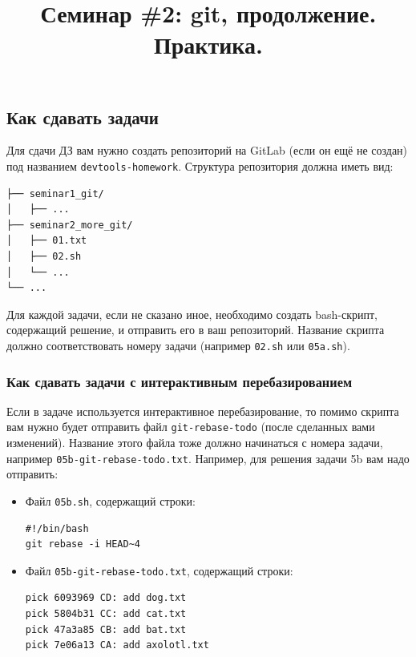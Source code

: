 \documentclass{article}
\begin{document}
\title{Семинар \#2: git, продолжение. Практика. \vspace{-5ex}}\date{}\maketitle

\subsection*{Как сдавать задачи}
Для сдачи ДЗ вам нужно создать репозиторий на GitLab (если он ещё не создан) под названием \texttt{devtools-homework}. Структура репозитория должна иметь вид:
\begin{center}
\begin{BVerbatim}
├── seminar1_git/
│   ├── ...
├── seminar2_more_git/
│   ├── 01.txt
│   ├── 02.sh
│   └── ...
└── ...
\end{BVerbatim}
\end{center}
Для каждой задачи, если не сказано иное, необходимо создать bash-скрипт, содержащий решение, и отправить его в ваш репозиторий. Название скрипта должно соответствовать номеру задачи (например \texttt{02.sh} или \texttt{05a.sh}). 

\subsubsection*{Как сдавать задачи с интерактивным перебазированием}
Если в задаче используется интерактивное перебазирование, то помимо скрипта вам нужно будет отправить файл \texttt{git-rebase-todo} (после сделанных вами изменений). Название этого файла тоже должно начинаться с номера задачи, например \texttt{05b-git-rebase-todo.txt}.
Например, для решения задачи 5b вам надо отправить:
\begin{itemize}
\item Файл \texttt{05b.sh}, содержащий строки:
\begin{lstlisting}
#!/bin/bash
git rebase -i HEAD~4
\end{lstlisting}
\item Файл \texttt{05b-git-rebase-todo.txt}, содержащий строки:
\begin{lstlisting}
pick 6093969 CD: add dog.txt
pick 5804b31 CC: add cat.txt
pick 47a3a85 CB: add bat.txt
pick 7e06a13 CA: add axolotl.txt
\end{lstlisting}
\end{itemize}

\vspace{-3mm}
\end{document}
